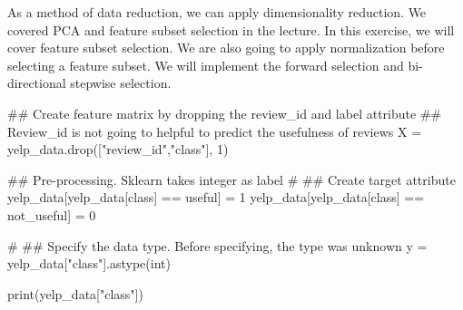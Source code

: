\documentclass[
  letterpaper,
]{scrbook}
\newenvironment{Shaded}{\begin{snugshade}}{\end{snugshade}}
\newcommand{\BuiltInTok}[1]{\textcolor[rgb]{0.00,0.23,0.31}{#1}}
\newcommand{\CommentTok}[1]{\textcolor[rgb]{0.37,0.37,0.37}{#1}}
\newcommand{\DecValTok}[1]{\textcolor[rgb]{0.68,0.00,0.00}{#1}}
\newcommand{\NormalTok}[1]{\textcolor[rgb]{0.00,0.23,0.31}{#1}}
\newcommand{\OperatorTok}[1]{\textcolor[rgb]{0.37,0.37,0.37}{#1}}
\newcommand{\StringTok}[1]{\textcolor[rgb]{0.13,0.47,0.30}{#1}}
\begin{document}
As a method of data reduction, we can apply dimensionality reduction. We
covered PCA and feature subset selection in the lecture. In this
exercise, we will cover feature subset selection. We are also going to
apply normalization before selecting a feature subset. We will implement
the forward selection and bi-directional stepwise selection.

\begin{Shaded}
\begin{Highlighting}[]
\CommentTok{\#\# Create feature matrix by dropping the review\_id and label attribute}
\CommentTok{\#\# Review\_id is not going to helpful to predict the usefulness of reviews}
\NormalTok{X }\OperatorTok{=}\NormalTok{ yelp\_data.drop([}\StringTok{"review\_id"}\NormalTok{,}\StringTok{"class"}\NormalTok{], }\DecValTok{1}\NormalTok{)    }

\CommentTok{\#\# Pre{-}processing. Sklearn takes integer as label}
\CommentTok{\# \#\# Create target attribute}
\NormalTok{yelp\_data[yelp\_data[}\StringTok{\textquotesingle{}class\textquotesingle{}}\NormalTok{] }\OperatorTok{==} \StringTok{\textquotesingle{}useful\textquotesingle{}}\NormalTok{] }\OperatorTok{=} \DecValTok{1}
\NormalTok{yelp\_data[yelp\_data[}\StringTok{\textquotesingle{}class\textquotesingle{}}\NormalTok{] }\OperatorTok{==} \StringTok{\textquotesingle{}not\_useful\textquotesingle{}}\NormalTok{] }\OperatorTok{=} \DecValTok{0}

\CommentTok{\# \#\# Specify the data type. Before specifying, the type was unknown}
\NormalTok{y }\OperatorTok{=}\NormalTok{ yelp\_data[}\StringTok{"class"}\NormalTok{].astype(}\StringTok{\textquotesingle{}int\textquotesingle{}}\NormalTok{)}

\BuiltInTok{print}\NormalTok{(yelp\_data[}\StringTok{"class"}\NormalTok{])}
\end{Highlighting}
\end{Shaded}
\end{document}
